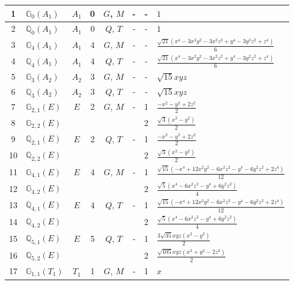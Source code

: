 \documentclass[fleqn,10pt,landscape]{jsarticle}
\begin{document}
\begin{longtable}[l]{clcccccl}
1 & $\mathbb{G}_{0}(A_{1})$ & $A_{1}$ & 0 & $G$, $M$ & - & - & $1$ \\ \hline
2 & $\mathbb{Q}_{0}(A_{1})$ & $A_{1}$ & 0 & $Q$, $T$ & - & - & $1$ \\ \hline
3 & $\mathbb{G}_{4}(A_{1})$ & $A_{1}$ & 4 & $G$, $M$ & - & - & $\frac{\sqrt{21} \left(x^{4} - 3 x^{2} y^{2} - 3 x^{2} z^{2} + y^{4} - 3 y^{2} z^{2} + z^{4}\right)}{6}$ \\ \hline
4 & $\mathbb{Q}_{4}(A_{1})$ & $A_{1}$ & 4 & $Q$, $T$ & - & - & $\frac{\sqrt{21} \left(x^{4} - 3 x^{2} y^{2} - 3 x^{2} z^{2} + y^{4} - 3 y^{2} z^{2} + z^{4}\right)}{6}$ \\ \hline
5 & $\mathbb{G}_{3}(A_{2})$ & $A_{2}$ & 3 & $G$, $M$ & - & - & $\sqrt{15} x y z$ \\ \hline
6 & $\mathbb{Q}_{3}(A_{2})$ & $A_{2}$ & 3 & $Q$, $T$ & - & - & $\sqrt{15} x y z$ \\ \hline
7 & $\mathbb{G}_{2,1}(E)$ & $E$ & 2 & $G$, $M$ & - & 1 & $\frac{- x^{2} - y^{2} + 2 z^{2}}{2}$ \\
8 & $\mathbb{G}_{2,2}(E)$ &  &  &  &  & 2 & $\frac{\sqrt{3} \left(x^{2} - y^{2}\right)}{2}$ \\ \hline
9 & $\mathbb{Q}_{2,1}(E)$ & $E$ & 2 & $Q$, $T$ & - & 1 & $\frac{- x^{2} - y^{2} + 2 z^{2}}{2}$ \\
10 & $\mathbb{Q}_{2,2}(E)$ &  &  &  &  & 2 & $\frac{\sqrt{3} \left(x^{2} - y^{2}\right)}{2}$ \\ \hline
11 & $\mathbb{G}_{4,1}(E)$ & $E$ & 4 & $G$, $M$ & - & 1 & $\frac{\sqrt{15} \left(- x^{4} + 12 x^{2} y^{2} - 6 x^{2} z^{2} - y^{4} - 6 y^{2} z^{2} + 2 z^{4}\right)}{12}$ \\
12 & $\mathbb{G}_{4,2}(E)$ &  &  &  &  & 2 & $\frac{\sqrt{5} \left(x^{4} - 6 x^{2} z^{2} - y^{4} + 6 y^{2} z^{2}\right)}{4}$ \\ \hline
13 & $\mathbb{Q}_{4,1}(E)$ & $E$ & 4 & $Q$, $T$ & - & 1 & $\frac{\sqrt{15} \left(- x^{4} + 12 x^{2} y^{2} - 6 x^{2} z^{2} - y^{4} - 6 y^{2} z^{2} + 2 z^{4}\right)}{12}$ \\
14 & $\mathbb{Q}_{4,2}(E)$ &  &  &  &  & 2 & $\frac{\sqrt{5} \left(x^{4} - 6 x^{2} z^{2} - y^{4} + 6 y^{2} z^{2}\right)}{4}$ \\ \hline
15 & $\mathbb{Q}_{5,1}(E)$ & $E$ & 5 & $Q$, $T$ & - & 1 & $\frac{3 \sqrt{35} x y z \left(x^{2} - y^{2}\right)}{2}$ \\
16 & $\mathbb{Q}_{5,2}(E)$ &  &  &  &  & 2 & $\frac{\sqrt{105} x y z \left(x^{2} + y^{2} - 2 z^{2}\right)}{2}$ \\ \hline
17 & $\mathbb{G}_{1,1}(T_{1})$ & $T_{1}$ & 1 & $G$, $M$ & - & 1 & $x$ \\

\end{longtable}
\end{document}
